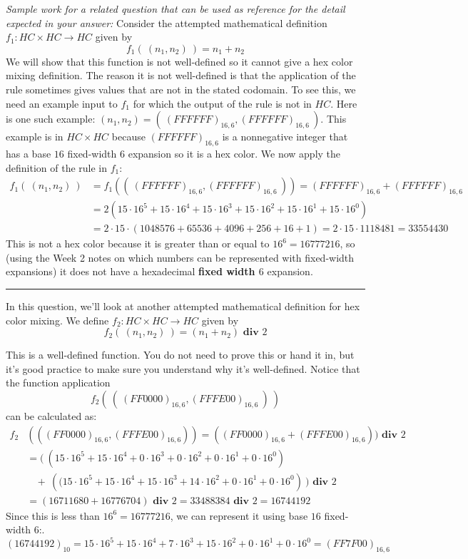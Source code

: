 \begin{enumerate}[labelindent=0pt, leftmargin=0pt]
\begin{enumerate}
{\it Sample work for a related question that can be used as reference for the detail expected 
in your answer:} Consider the attempted mathematical definition  $f_1: HC\times HC \to HC$ given by
\[
f_1 (~(n_1, n_2) ~) = n_1 + n_2
\]
We will show that this function is not well-defined so it cannot give a hex color mixing definition. 
The reason it is not well-defined
is that the application of the rule sometimes gives values that are not in the stated codomain. 
To see this, we need an example input to $f_1$ for which the output of the rule is not in $HC$.
Here is one such example: $(n_1, n_2) = (~(FFFFFF)_{16,6}, (FFFFFF)_{16,6}~)$. 
This example is in $HC \times HC$
because $(FFFFFF)_{16,6}$ is a nonnegative integer that has a base $16$ fixed-width $6$ expansion 
so it is a hex color.
We now apply the definition of the rule in $f_1$:
\begin{align*}
f_1 (~(n_1, n_2) ~) &=  f_1 ( (~(FFFFFF)_{16,6}, (FFFFFF)_{16,6}~) ) = (FFFFFF)_{16,6} + (FFFFFF)_{16,6} \\
&= 2 \left( 15\cdot 16^5 + 15\cdot 16^4 + 15 \cdot 16^3 + 15 \cdot 16^2 + 15 \cdot 16^1 + 15 \cdot 16^0 \right) \\
&= 2 \cdot 15 \cdot (1048576 + 65536 + 4096 + 256 + 16 + 1) = 2 \cdot 15 \cdot 1118481 = 33554430
\end{align*}
This is not a hex color because it is greater than or equal to $16^6 = 16777216$, 
so (using the Week 2 notes on which numbers can be represented
with fixed-width expansions) it does not have a hexadecimal {\bf fixed width $6$} expansion.

\rule{0.5\textwidth}{.4pt}

In this question, we'll look at another attempted mathematical definition for hex color mixing. 
We define $f_2: HC\times HC \to HC$ given by
\[
f_2 (~(n_1, n_2) ~) = (n_1 + n_2) \textbf{ div } 2
\]

This is a well-defined function. You do not need to prove this or hand it in, but it's good practice to make 
sure you understand why it's well-defined. Notice that the function application 
\[
f_2 ( ~(~ (FF0000)_{16,6} , (FFFE00)_{16,6} ~)~)
\]
can be calculated as:
\begin{align*}
f_2&(((FF0000)_{16,6}, (FFFE00)_{16,6}))=
 ((FF0000)_{16,6} + (FFFE00)_{16,6})) \textbf{ div } 2\\
&= \big(~ \left(15\cdot16^5 + 15\cdot16^4 + 0\cdot16^3 + 0\cdot16^2 + 0\cdot16^1 + 0\cdot16^0 \right) \\
&~~~~+~
    \left((15\cdot16^5 + 15\cdot16^4 + 15\cdot16^3 + 14\cdot16^2 + 0\cdot16^1 + 0\cdot16^0\right )~\big )\textbf{ div } 2\\
&= (16711680 + 16776704) \textbf{ div } 2 = 33488384 \textbf{ div } 2 = 16744192
\end{align*}
Since this is less than $16^6 = 16777216$, we can represent it using base $16$ fixed-width $6$:.
$$(16744192)_{10} = 15\cdot16^5 + 15\cdot16^4 + 7\cdot16^3 + 15\cdot16^2 + 0\cdot16^1 + 0\cdot16^0 = (FF7F00)_{16,6}$$


\end{enumerate}
\end{enumerate}
